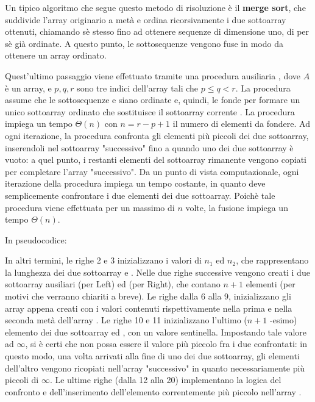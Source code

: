 Un tipico algoritmo che segue questo metodo di risoluzione è il \textbf{merge sort}, che suddivide l'array originario a metà e ordina ricorsivamente i due sottoarray ottenuti, chiamando sè stesso fino ad ottenere sequenze di dimensione uno, di per sè già ordinate. A questo punto, le sottosequenze vengono fuse in modo da ottenere un array ordinato. 

Quest'ultimo passaggio viene effettuato tramite una procedura ausiliaria , dove \(A\) è un array, e \(p,q,r\) sono tre indici dell'array tali che \(p\le q < r\).
La procedura assume che le sottosequenze  e  siano ordinate e, quindi, le fonde per formare un unico sottoarray ordinato che sostituisce il sottoarray corrente . La procedura  impiega un tempo \(\Theta(n)\) con \(n=r-p+1\) il numero di elementi da fondere. Ad ogni iterazione, la procedura  confronta gli elementi più piccoli dei due sottoarray, inserendoli nel sottoarray "successivo" fino a quando uno dei due sottoarray è vuoto: a quel punto, i restanti elementi del sottoarray rimanente vengono copiati per completare l'array "successivo". Da un punto di vista computazionale, ogni iterazione della procedura impiega un tempo costante, in quanto deve semplicemente confrontare i due elementi dei due sottoarray. Poichè tale procedura viene effettuata per un massimo di \(n\) volte, la fusione impiega un tempo \(\Theta(n)\).

In pseudocodice:



\noindent
In altri termini, le righe 2 e 3 inizializzano i valori di \(n_1\) ed \(n_2\), che rappresentano la lunghezza dei due sottoarray  e . Nelle due righe successive vengono creati i due sottoarray ausiliari  (per Left) ed  (per Right), che contano \(n+1\) elementi (per motivi che verranno chiariti a breve). Le righe dalla 6 alla 9, inizializzano gli array appena creati con i valori contenuti rispettivamente nella prima e nella seconda metà dell'array . Le righe 10 e 11 inizializzano l'ultimo (\(n+1\) -esimo) elemento dei due sottoarray  ed , con un valore sentinella. Impostando tale valore ad \(\infty\), si è certi che non possa essere il valore più piccolo fra i due confrontati: in questo modo, una volta arrivati alla fine di uno dei due sottoarray, gli elementi dell'altro vengono ricopiati nell'array "successivo" in quanto necessariamente più piccoli di \(\infty\). Le ultime righe (dalla 12 alla 20) implementano la logica del confronto e dell'inserimento dell'elemento correntemente più piccolo nell'array .

